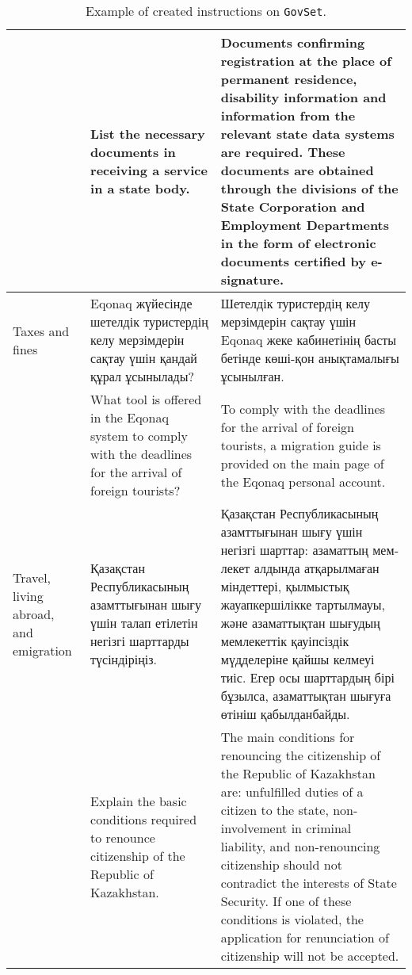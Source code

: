 \begin{table*}[b!]
{\begin{tabular}{p{}p{}p{}}
 & List the necessary documents in receiving a service in a state body. & Documents confirming registration at the place of permanent residence, disability information and information from the relevant state data systems are required. These documents are obtained through the divisions of the State Corporation and Employment Departments in the form of electronic documents certified by e-signature.  \\
\midrule

Taxes and fines & \foreignlanguage{russian}{ Eqonaq жүйесінде шетелдік туристердің келу мерзімдерін сақтау үшін қандай құрал ұсынылады? } & \foreignlanguage{russian}{ Шетелдік туристердің келу мерзімдерін сақтау үшін Eqonaq жеке кабинетінің басты бетінде көші-қон анықтамалығы ұсынылған. } \\ 

 & What tool is offered in the Eqonaq system to comply with the deadlines for the arrival of foreign tourists? & To comply with the deadlines for the arrival of foreign tourists, a migration guide is provided on the main page of the Eqonaq personal account. \\
\midrule

Travel, living abroad, and emigration & \foreignlanguage{russian}{ Қазақстан Республикасының азамттығынан шығу үшін талап етілетін негізгі шарттарды түсіндіріңіз. } & \foreignlanguage{russian}{ Қазақстан Республикасының азамттығынан шығу үшін негізгі шарттар: азаматтың мемлекет алдында атқарылмаған міндеттері, қылмыстық жауапкершілікке тартылмауы, және азаматтықтан шығудың мемлекеттік қауіпсіздік мүдделеріне қайшы келмеуі тиіс. Егер осы шарттардың бірі бұзылса, азаматтықтан шығуға өтініш қабылданбайды. } \\ 

 & Explain the basic conditions required to renounce citizenship of the Republic of Kazakhstan. & The main conditions for renouncing the citizenship of the Republic of Kazakhstan are: unfulfilled duties of a citizen to the state, non-involvement in criminal liability, and non-renouncing citizenship should not contradict the interests of State Security. If one of these conditions is violated, the application for renunciation of citizenship will not be accepted.  \\
\bottomrule
\end{tabular} }
\caption{Example of created instructions on \texttt{GovSet}.}
\end{table*}






